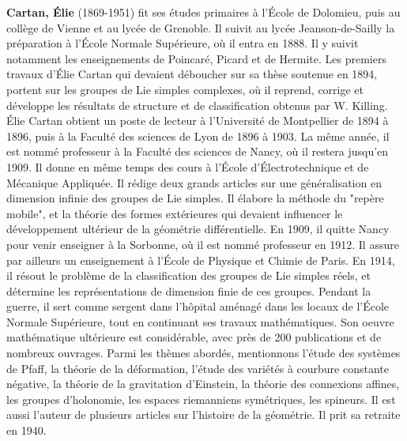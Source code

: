 \textbf{Cartan, Élie} (1869-1951) fit ses études primaires à l'École de Dolomieu, puis au collège de Vienne et au lycée de Grenoble. Il suivit au lycée Jeanson-de-Sailly la préparation à l'École Normale Supérieure, où il entra en 1888. Il y suivit notamment les enseignements de Poincaré, Picard et de Hermite. Les premiers travaux d'Élie Cartan qui devaient déboucher sur sa thèse soutenue en 1894, portent sur les groupes de Lie simples complexes, où il reprend, corrige et développe les résultats de structure et de classification obtenus par W. Killing. Élie Cartan obtient un poste de lecteur à l'Université de Montpellier de 1894 à 1896, puis à la Faculté des sciences de Lyon de 1896 à 1903. La même année, il est nommé professeur à la Faculté des sciences de Nancy, où il restera jusqu'en 1909. Il donne en même temps des cours à l'École d'Électrotechnique et de Mécanique Appliquée. Il rédige deux grands articles sur une généralisation en dimension infinie des groupes de Lie simples. Il élabore la méthode du "repère mobile", et la théorie des formes extérieures qui devaient influencer le développement ultérieur de la géométrie différentielle. En 1909, il quitte Nancy pour venir enseigner à la Sorbonne, où il est nommé professeur en 1912. Il assure par ailleurs un enseignement à l'École de Physique et Chimie de Paris. En 1914, il résout le problème de la classification des groupes de Lie simples réels, et détermine les représentations de dimension finie de ces groupes. Pendant la guerre, il sert comme sergent dans l'hôpital aménagé dans les locaux de l'École Normale Supérieure, tout en continuant ses travaux mathématiques. Son oeuvre mathématique ultérieure est considérable, avec près de 200 publications et de nombreux ouvrages. Parmi les thèmes abordés, mentionnons l'étude des systèmes de Pfaff, la théorie de la déformation, l'étude des variétés à courbure constante négative, la théorie de la gravitation d'Einstein, la théorie des connexions affines, les groupes d'holonomie, les espaces riemanniens symétriques, les spineurs. Il est aussi l'auteur de plusieurs articles sur l'histoire de la géométrie. Il prit sa retraite en 1940.


